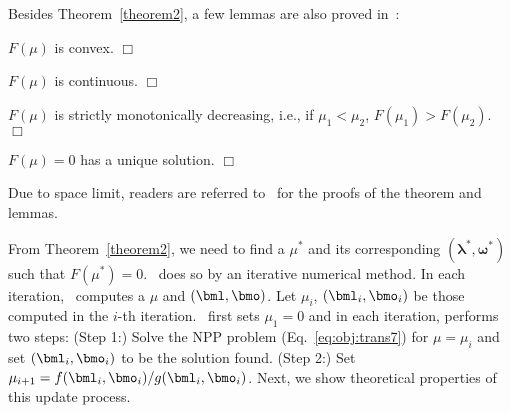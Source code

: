 Besides Theorem~\ref{theorem2}, a few lemmas are also proved in~\cite{dinkelbach1967nonlinear}:

\begin{lemma}
\label{lemma1}
$F(\mu)$ is convex.
\hfill$\Box$
\end{lemma}
\begin{lemma}
\label{lemma2}
$F(\mu)$ is continuous.
\hfill$\Box$
\end{lemma}
\begin{lemma}
\label{lemma3}
$F(\mu)$ is strictly monotonically decreasing, i.e., if $\mu_1 < \mu_2$, $F(\mu_1) > F(\mu_2)$.
\hfill$\Box$
\end{lemma}
\begin{lemma}
\label{lemma4}
$F(\mu) = 0$ has a unique solution.
\hfill$\Box$
\end{lemma}
Due to space limit, 
readers are referred to~\cite{dinkelbach1967nonlinear, stancu2012fractional} for the proofs of the theorem and lemmas.

From Theorem~\ref{theorem2}, we need to find
a $\mu^*$ and its corresponding $({\bm \lambda^*}, {\bm \omega^*})$ such that $F(\mu^*) = 0$.
\schain\ does so by an iterative numerical method.
In each iteration, \schain\ computes a $\mu$ and $(\bml, \bmo)$.
Let $\mu_i$, $(\bml_i, \bmo_i)$ be those computed in the $i$-th iteration.
\schain\ first sets $\mu_1 = 0$ and in each iteration, performs two steps:
(Step 1:) Solve the NPP problem (Eq.~\ref{eq:obj:trans7}) for $\mu = \mu_i$ and set $(\bml_i, \bmo_i)$ to be the solution found. 
(Step 2:) Set $\mu_{i+1} = f(\bml_i, \bmo_i)/g(\bml_i, \bmo_i)$.
Next, we show theoretical properties of this update process.

